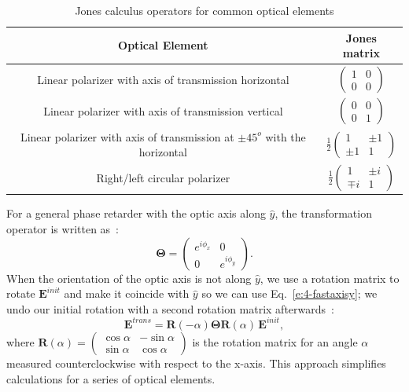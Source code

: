 \begin{table}
\caption{Jones calculus operators for common optical elements}
\begin{tabular}{|c|c|}
\hline
{\bf Optical Element} & {\bf Jones matrix} \\ \hline \hline
Linear polarizer with axis of transmission horizontal & $\begin{pmatrix}1 & 0 \\ 0 & 0 \end{pmatrix}$ \\ \hline
Linear polarizer with axis of transmission vertical &$\begin{pmatrix}0 & 0 \\ 0 & 1 \end{pmatrix}$ \\ \hline
Linear polarizer with axis of transmission at $\pm 45^o$ with the horizontal &$\frac{1}{2} \begin{pmatrix}1 & \pm 1 \\ \pm 1 & 1\end{pmatrix}$ \\ \hline
Right/left circular polarizer & $\frac{1}{2} \begin{pmatrix}
1 & \pm i \\ \mp i & 1
\end{pmatrix}$ \\
\hline
\end{tabular}\label{t:4-jmats}
\end{table}

For a general phase retarder with the optic axis along $\hat{y}$, the transformation operator is written as~\cite{RN232}:
\begin{equation}\label{e:4-fastaxisy}
\bm{\Theta} = \begin{pmatrix}e^{i \phi_x} & 0 \\ 0 & e^{i \phi_y} \end{pmatrix}.
\end{equation}
When the orientation of the optic axis is not along $\hat{y}$, we use a rotation matrix to rotate $\mathbf{E}^{init}$ and make it coincide with $\hat{y}$ so we can use Eq.~\ref{e:4-fastaxisy}; we undo our initial rotation with a second rotation matrix afterwards~\cite{RN310}:
\begin{equation} \label{e:4-jones_decouple}
\mathbf{E}^{trans} = \mathbf{R}(-\alpha)\bm{\Theta} \mathbf{R}(\alpha)\,\mathbf{E}^{init},
\end{equation}
where $\mathbf{R}(\alpha) = \begin{pmatrix} \cos \alpha & -\sin \alpha \\ \sin \alpha & \cos \alpha \end{pmatrix}$
is the rotation matrix for an angle $\alpha$ measured counterclockwise with respect to the x-axis.
This approach simplifies calculations for a series of optical elements.

